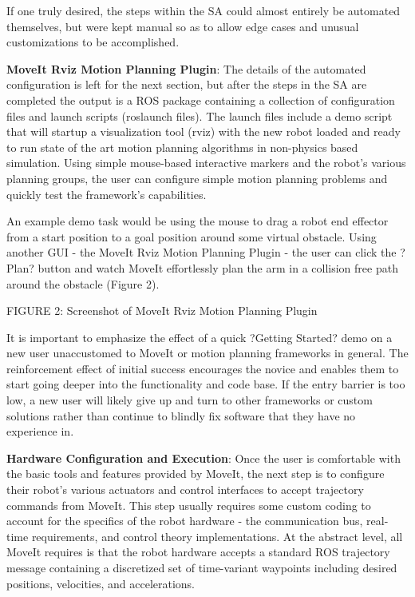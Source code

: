 \documentclass[10pt,journal,compsoc]{joser1}
\begin{document}
{If one truly desired, the steps within the SA could almost entirely be automated themselves, but were kept manual so as to allow edge cases and unusual customizations to be accomplished.

{\bf MoveIt Rviz Motion Planning Plugin}: The details of the automated configuration is left for the next section, but after the steps in the SA are completed the output is a ROS package containing a collection of configuration files and launch scripts (roslaunch files). The launch files include a demo script that will startup a visualization tool (rviz) with the new robot loaded and ready to run state of the art motion planning algorithms in non-physics based simulation. Using simple mouse-based interactive markers and the robot's various planning groups, the user can configure simple motion planning problems and quickly test the framework's capabilities.  

An example demo task would be using the mouse to drag a robot end effector from a start position to a goal position around some virtual obstacle. Using another GUI - the MoveIt Rviz Motion Planning Plugin - the user can click the ?Plan? button and watch MoveIt effortlessly plan the arm in a collision free path around the obstacle (Figure 2).

FIGURE 2: Screenshot of MoveIt Rviz Motion Planning Plugin

It is important to emphasize the effect of a quick ?Getting Started? demo on a new user unaccustomed to MoveIt or motion planning frameworks in general. The reinforcement effect of initial success encourages the novice and enables them to start going deeper into the functionality and code base. If the entry barrier is too low, a new user will likely give up and turn to other frameworks or custom solutions rather than continue to blindly fix software that they have no experience in.

{\bf Hardware Configuration and Execution}: Once the user is comfortable with the basic tools and features provided by MoveIt, the next step is to configure their robot's various actuators and control interfaces to accept trajectory commands from MoveIt. This step usually requires some custom coding to account for the specifics of the robot hardware - the communication bus, real-time requirements, and control theory implementations. At the abstract level, all MoveIt requires is that the robot hardware accepts a standard ROS trajectory message containing a discretized set of time-variant waypoints including desired positions, velocities, and accelerations. 

}
\end{document}
